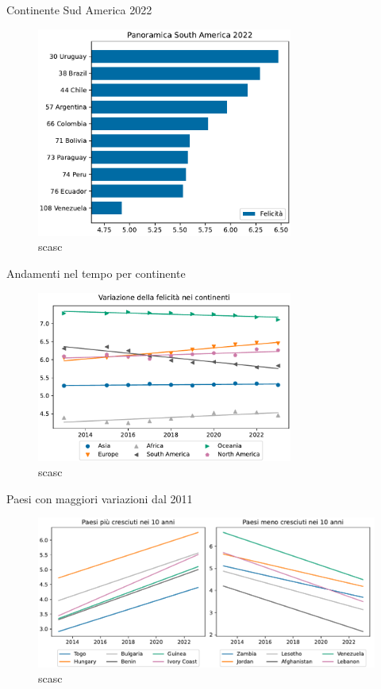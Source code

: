 \documentclass{beamer}
\begin{document}
\begin{frame}{Continente Sud America 2022}
	\begin{figure}
		\centering
		\includegraphics[width=0.75\textwidth]{"./img/4Classifica_South America_2022.pdf"}
		\caption{scasc}
	\end{figure}
\end{frame}

\begin{frame}{Andamenti nel tempo per continente}
	\begin{figure}
		\centering
		\includegraphics[width=0.75\textwidth]{"./img/5AndamentiContinentali.pdf"}
		\caption{scasc}
	\end{figure}
\end{frame}
\begin{frame}{Paesi con maggiori variazioni dal 2011}
	\begin{figure}
		\centering
		\includegraphics[width=1\textwidth]{"./img/6MaggioreVariazione.pdf"}
		\caption{scasc}
	\end{figure}
\end{frame}
\end{document}
